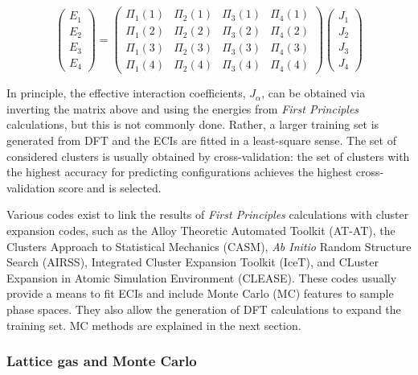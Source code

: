 \documentclass[../main.tex]{subfiles}
\begin{document}
\begin{equation}
{\left( \begin{array}{cccc}
{E_1}\\
{E_2}\\
{E_3}\\
{E_4}
\end{array}\right)}=
{\left( \begin{array}{cccc}
{\Pi_1}(1) & {\Pi_2}(1) & {\Pi_3}(1) & {\Pi_4}(1) \\
{\Pi_1}(2) & {\Pi_2}(2) & {\Pi_3}(2) & {\Pi_4}(2)  \\
{\Pi_1}(3) & {\Pi_2}(3) & {\Pi_3}(3) & {\Pi_4}(3)  \\
{\Pi_1}(4) & {\Pi_2}(4) & {\Pi_3}(4) & {\Pi_4}(4) 
\end{array}\right)}
{\left(\begin{array}{cccc}
{J_1}\\
{J_2}\\
{J_3}\\
{J_4}
\end{array}\right)}
\end{equation}

In principle, the effective interaction coefficients, $J_\alpha$, can be obtained via inverting the matrix above and using the energies from \textit{First Principles} calculations, but this is not commonly done. Rather, a larger training set is generated from DFT and the ECIs are fitted in a least-square sense. The set of considered clusters is usually obtained by cross-validation: the set of clusters with the highest accuracy for predicting configurations achieves the highest cross-validation score and is selected.

Various codes exist to link the results of \textit{First Principles} calculations with cluster expansion codes, such as the Alloy Theoretic Automated Toolkit (AT-AT),\cite{avdw:atat2,avdw:atat,VandeWalle2002} the Clusters Approach to Statistical Mechanics (CASM),\cite{natarajan2017} \textit{Ab Initio} Random Structure Search (AIRSS),\cite{Pickard_2011} Integrated Cluster Expansion Toolkit (IceT),\cite{angvist2019} and CLuster Expansion in Atomic Simulation Environment (CLEASE).\cite{chang2019} These codes usually provide a means to fit ECIs and include Monte Carlo (MC) features to sample phase spaces. They also allow the generation of DFT calculations to expand the training set. MC methods are explained in the next section.

\subsubsection{Lattice gas and Monte Carlo}
\label{sec:monte_carlo}
\end{document}

